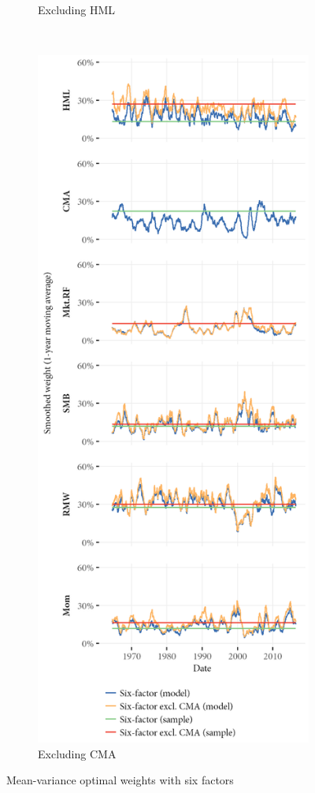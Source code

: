 \begin{figure}[htbp]
\begin{subfigure}{0.45\textwidth}
    \caption{Excluding HML}
  \end{subfigure}
  ~
  \begin{subfigure}{0.45\textwidth}
    \includegraphics[width=\textwidth]{graphics/weights/main_Weights_MV_6F_EXCL_CMA_6F.png}
    \caption{Excluding CMA}
  \end{subfigure}
  \caption{Mean-variance optimal weights with six factors}


\end{figure}
